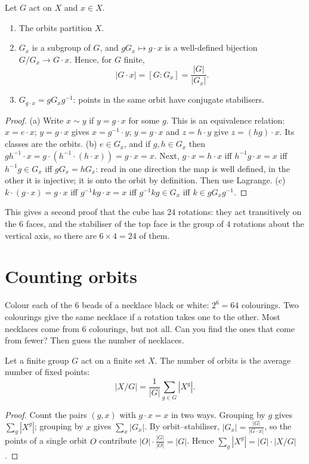 \begin{theorem}\label{thm:orbstab}
Let $G$ act on $X$ and $x\in X$.
\begin{enumerate}[label=(\alph*)]
\item The orbits partition $X$.
\item $G_x$ is a subgroup of $G$, and $gG_x\mapsto g\cdot x$ is a well-defined bijection $G/G_x\to G\cdot x$. Hence, for $G$ finite,
\[
|G\cdot x|=[G:G_x]=\frac{|G|}{|G_x|}.
\]
\item $G_{g\cdot x}=gG_xg^{-1}$: points in the same orbit have conjugate stabilisers.
\end{enumerate}
\end{theorem}
\begin{proof}
(a) Write $x\sim y$ if $y=g\cdot x$ for some $g$. This is an equivalence relation: $x=e\cdot x$; $y=g\cdot x$ gives $x=g^{-1}\cdot y$; $y=g\cdot x$ and $z=h\cdot y$ give $z=(hg)\cdot x$. Its classes are the orbits.
(b) $e\in G_x$, and if $g,h\in G_x$ then $gh^{-1}\cdot x=g\cdot(h^{-1}\cdot(h\cdot x))=g\cdot x=x$. Next, $g\cdot x=h\cdot x$ iff $h^{-1}g\cdot x=x$ iff $h^{-1}g\in G_x$ iff $gG_x=hG_x$: read in one direction the map is well defined, in the other it is injective; it is onto the orbit by definition. Then use Lagrange.
(c) $k\cdot(g\cdot x)=g\cdot x$ iff $g^{-1}kg\cdot x=x$ iff $g^{-1}kg\in G_x$ iff $k\in gG_xg^{-1}$.
\end{proof}

This gives a second proof that the cube has $24$ rotations: they act transitively on the $6$ faces, and the stabiliser of the top face is the group of $4$ rotations about the vertical axis, so there are $6\times4=24$ of them.

\section{Counting orbits}

\begin{think}
Colour each of the $6$ beads of a necklace black or white: $2^6=64$ colourings. Two colourings give the same necklace if a rotation takes one to the other. Most necklaces come from $6$ colourings, but not all. Can you find the ones that come from fewer? Then guess the number of necklaces.
\end{think}

\begin{theorem}\label{thm:burnside}
Let a finite group $G$ act on a finite set $X$. The number of orbits is the average number of fixed points:
\[
|X/G|=\frac1{|G|}\sum_{g\in G}|X^g|.
\]
\end{theorem}
\begin{proof}
Count the pairs $(g,x)$ with $g\cdot x=x$ in two ways. Grouping by $g$ gives $\sum_g|X^g|$; grouping by $x$ gives $\sum_x|G_x|$. By orbit--stabiliser, $|G_x|=\frac{|G|}{|G\cdot x|}$, so the points of a single orbit $O$ contribute $|O|\cdot\frac{|G|}{|O|}=|G|$. Hence $\sum_g|X^g|=|G|\cdot|X/G|$.
\end{proof}

